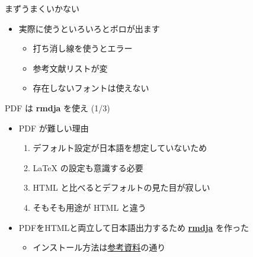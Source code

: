 \documentclass[
  ignorenonframetext,
]{beamer}
\providecommand{\tightlist}{%
  \setlength{\itemsep}{0pt}\setlength{\parskip}{0pt}}
\begin{document}
\begin{frame}{まずうまくいかない}
\protect\hypertarget{ux307eux305aux3046ux307eux304fux3044ux304bux306aux3044}{}
\begin{itemize}
\item
  実際に使うといろいろとボロが出ます

  \begin{itemize}
  \tightlist
  \item
    打ち消し線を使うとエラー
  \item
    参考文献リストが変
  \item
    存在しないフォントは使えない
  \end{itemize}
\end{itemize}
\end{frame}

\begin{frame}{PDF は \textbf{rmdja} を使え (1/3)}
\protect\hypertarget{pdf-ux306f-rmdja-ux3092ux4f7fux3048-13}{}
\begin{itemize}
\item
  PDF が難しい理由

  \begin{enumerate}
  \tightlist
  \item
    デフォルト設定が日本語を想定していないため
  \item
    LaTeX の設定も意識する必要
  \item
    HTML と比べるとデフォルトの見た目が寂しい
  \item
    そもそも用途が HTML と違う
  \end{enumerate}
\item
  PDFをHTMLと両立して日本語出力するため \href{https://github.com/Gedevan-Aleksizde/rmdja}{\textbf{rmdja}} を作った

  \begin{itemize}
  \tightlist
  \item
    インストール方法は\href{https://rpubs.com/ktgrstsh/755893}{参考資料}の通り
  \end{itemize}
\end{itemize}
\end{frame}
\end{document}
